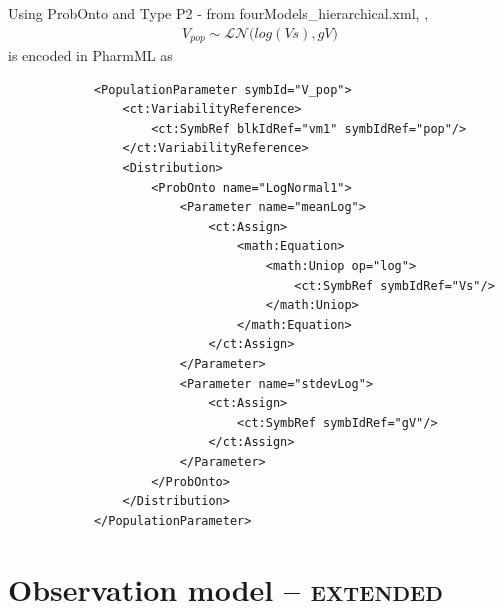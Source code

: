 \begin{example}
Using ProbOnto and Type P2 - from fourModels\_hierarchical.xml, \cite{LavielleFourModels:2014},
\begin{align*}
	V_{pop} \sim \mathcal {LN}\big(log(V\!s), gV\big)
\end{align*}
is encoded in PharmML as
\lstset{language=XML}
\begin{lstlisting}
            <PopulationParameter symbId="V_pop">
                <ct:VariabilityReference>
                    <ct:SymbRef blkIdRef="vm1" symbIdRef="pop"/>
                </ct:VariabilityReference>
                <Distribution>
                    <ProbOnto name="LogNormal1">
                        <Parameter name="meanLog">
                            <ct:Assign>
                                <math:Equation>
                                    <math:Uniop op="log">
                                        <ct:SymbRef symbIdRef="Vs"/>
                                    </math:Uniop>
                                </math:Equation>
                            </ct:Assign>
                        </Parameter>
                        <Parameter name="stdevLog">
                            <ct:Assign>
                                <ct:SymbRef symbIdRef="gV"/>
                            </ct:Assign>
                        </Parameter>
                    </ProbOnto>
                </Distribution>
            </PopulationParameter>
\end{lstlisting}
\end{example}

\section{Observation model -- {\color{black} \scshape{extended}}}
\label{sec:observationModel}


